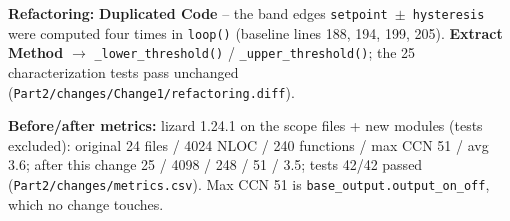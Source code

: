 \documentclass[11pt,a4paper]{article}
\newcommand{\field}[2]{\textbf{#1:} #2\par}
\begin{document}
\field{Refactoring}{\textbf{Duplicated Code} -- the band edges \texttt{setpoint $\pm$ hysteresis} were computed four times in \texttt{loop()} (baseline lines 188, 194, 199, 205). \textbf{Extract Method} $\rightarrow$ \texttt{\_\allowbreak{}lower\_\allowbreak{}threshold()} / \texttt{\_\allowbreak{}upper\_\allowbreak{}threshold()}; the 25 characterization tests pass unchanged (\texttt{Part2/\allowbreak{}changes/\allowbreak{}Change1/\allowbreak{}refactoring.\allowbreak{}diff}).}
\field{Before/after metrics}{lizard 1.24.1 on the scope files + new modules (tests excluded): original 24 files / 4024 NLOC / 240 functions / max CCN 51 / avg 3.6; after this change 25 / 4098 / 248 / 51 / 3.5; tests 42/42 passed (\texttt{Part2/\allowbreak{}changes/\allowbreak{}metrics.\allowbreak{}csv}). Max CCN 51 is \texttt{base\_\allowbreak{}output.\allowbreak{}output\_\allowbreak{}on\_\allowbreak{}off}, which no change touches.}
\end{document}
